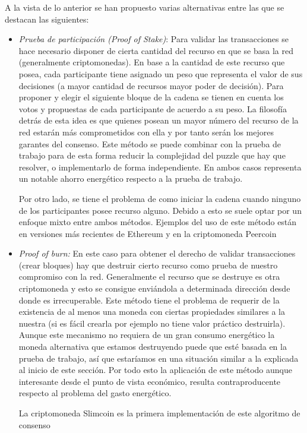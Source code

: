 A la vista de lo anterior se han propuesto varias alternativas entre las que se destacan las siguientes:
\begin{itemize}
\item \textit{Prueba de participación (Proof of Stake)}: Para validar las transacciones se hace necesario disponer de cierta cantidad del recurso en que se basa la red (generalmente criptomonedas). En base a la cantidad de este recurso que posea, cada participante tiene asignado un peso que representa el valor de sus decisiones (a mayor cantidad de recursos mayor poder de decisión). Para proponer y elegir el siguiente bloque de la cadena se tienen en cuenta los votos y propuestas de cada participante de acuerdo a su peso. La filosofía detrás de esta idea es que quienes posean un mayor número del recurso de la red estarán más comprometidos con ella y por tanto serán los mejores garantes del consenso. Este método se puede combinar con la prueba de trabajo para de esta forma reducir la complejidad del puzzle que hay que resolver, o implementarlo de forma independiente. En ambos casos representa un notable ahorro energético respecto a la prueba de trabajo.

Por otro lado, se tiene el problema de como iniciar la cadena cuando ninguno de los participantes posee recurso alguno. Debido a esto se suele optar por un enfoque mixto entre ambos métodos. Ejemplos del uso de este método están en versiones más recientes de Ethereum y en la criptomoneda Peercoin \citep{pos}

\item \textit{Proof of burn:} En este caso para obtener el derecho de validar transacciones (crear bloques) hay que destruir cierto recurso como prueba de nuestro compromiso con la red. Generalmente el recurso que se destruye es otra criptomoneda y esto se consigue enviándola a determinada dirección desde donde es irrecuperable. Este método tiene el problema de requerir de la existencia de al menos una moneda con ciertas propiedades similares a la nuestra (si es fácil crearla por ejemplo no tiene valor práctico destruirla). Aunque este mecanismo no requiera de un gran consumo energético la moneda alternativa que estamos destruyendo puede que esté basada en la prueba de trabajo, así que estaríamos en una situación similar a la explicada al inicio de este sección. Por todo esto la aplicación de este método aunque interesante desde el punto de vista económico, resulta contraproducente respecto al problema del gasto energético. 

La criptomoneda Slimcoin es la primera implementación de este algoritmo de consenso \citep{pob}
\end{itemize}

